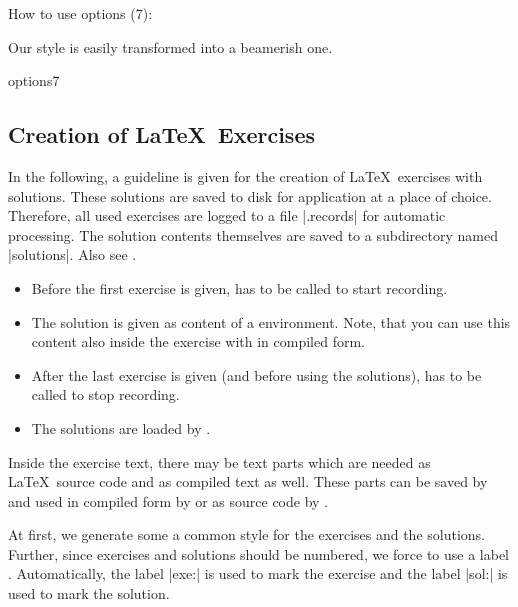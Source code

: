 \begin{dispExample}
\begin{texexptitled}[beamer,center lower,text outside listing,lefthand width=3.5cm]
  {How to use options (7):\par Our style is easily transformed into
    a beamerish one.}{options7}
\end{texexptitled}
\end{dispExample}


\clearpage
\subsection{Creation of \LaTeX\ Exercises}\label{listing:exercises}
In the following, a guideline is given for the creation of \LaTeX\ exercises
with solutions. These solutions are saved to disk for application at a place of
choice.
Therefore, all used exercises are logged to a file |\jobname.records| for automatic
processing. The solution contents themselves are saved to a subdirectory named
|solutions|. Also see .

\begin{itemize}
\item Before the first exercise is given,
   has to be called to start recording.
\item The solution is given as content of a 
  environment. Note, that you can use this content also inside the
  exercise with  in compiled form.
\item After the last exercise is given (and before using the solutions),
   has to be called to stop recording.
\item The solutions are loaded by .
\end{itemize}

Inside the exercise text, there may be text parts which are needed as
\LaTeX\ source code and as compiled text as well. These parts can be
saved by  and used in compiled form by 
or as source code by .

At first, we generate some a common style for the exercises and the
solutions. Further, since exercises and solutions should
be numbered, we force to use a label .
Automatically, the label |exe:| is used to mark the exercise
and the label |sol:| is used to mark the solution.

